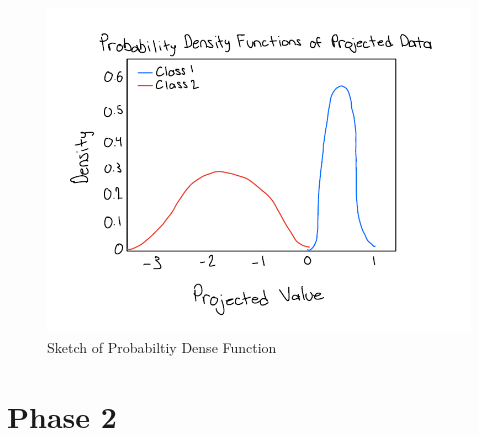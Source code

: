 \documentclass[12pt]{article}
\begin{document}




\begin{figure}[H]
    \centering
    \includegraphics[width=0.75\linewidth]{images/sketch_of_proability_density_function.png}
    \caption{Sketch of Probabiltiy Dense Function}
    \label{fig:probabilitysketch}
\end{figure}

\newpage
\section{Phase 2}
\end{document}
